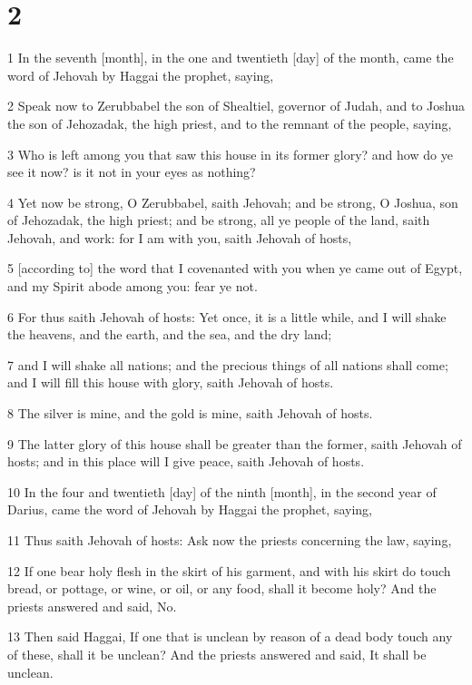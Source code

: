 \chapter{2}

\par 1 In the seventh [month], in the one and twentieth [day] of the month, came the word of Jehovah by Haggai the prophet, saying,
\par 2 Speak now to Zerubbabel the son of Shealtiel, governor of Judah, and to Joshua the son of Jehozadak, the high priest, and to the remnant of the people, saying,
\par 3 Who is left among you that saw this house in its former glory? and how do ye see it now? is it not in your eyes as nothing?
\par 4 Yet now be strong, O Zerubbabel, saith Jehovah; and be strong, O Joshua, son of Jehozadak, the high priest; and be strong, all ye people of the land, saith Jehovah, and work: for I am with you, saith Jehovah of hosts,
\par 5 [according to] the word that I covenanted with you when ye came out of Egypt, and my Spirit abode among you: fear ye not.
\par 6 For thus saith Jehovah of hosts: Yet once, it is a little while, and I will shake the heavens, and the earth, and the sea, and the dry land;
\par 7 and I will shake all nations; and the precious things of all nations shall come; and I will fill this house with glory, saith Jehovah of hosts.
\par 8 The silver is mine, and the gold is mine, saith Jehovah of hosts.
\par 9 The latter glory of this house shall be greater than the former, saith Jehovah of hosts; and in this place will I give peace, saith Jehovah of hosts.
\par 10 In the four and twentieth [day] of the ninth [month], in the second year of Darius, came the word of Jehovah by Haggai the prophet, saying,
\par 11 Thus saith Jehovah of hosts: Ask now the priests concerning the law, saying,
\par 12 If one bear holy flesh in the skirt of his garment, and with his skirt do touch bread, or pottage, or wine, or oil, or any food, shall it become holy? And the priests answered and said, No.
\par 13 Then said Haggai, If one that is unclean by reason of a dead body touch any of these, shall it be unclean? And the priests answered and said, It shall be unclean.
